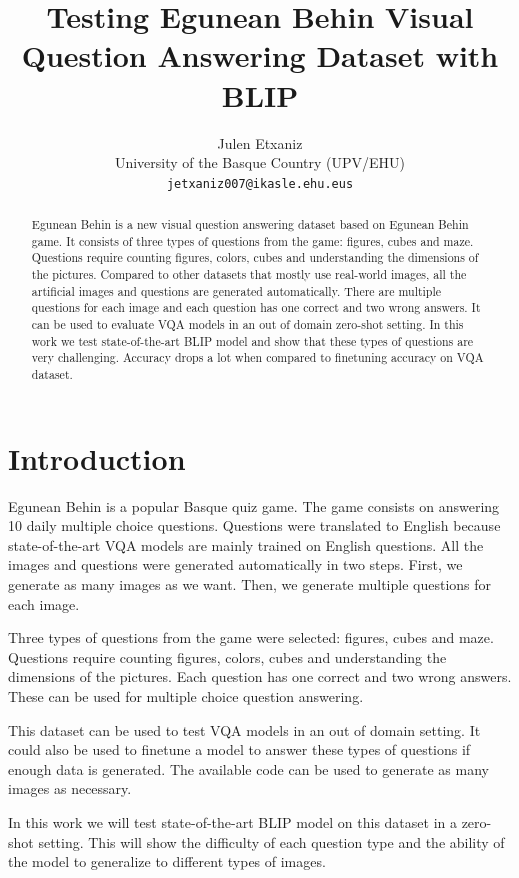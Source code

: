 \documentclass[11pt]{article}
\title{Testing Egunean Behin Visual Question Answering Dataset with BLIP}
\author{Julen Etxaniz \\
  University of the Basque Country (UPV/EHU) \\
  \texttt{jetxaniz007@ikasle.ehu.eus}}
\begin{document}
\maketitle
\begin{abstract}
Egunean Behin is a new visual question answering dataset based on Egunean Behin game. It consists of three types of questions from the game: figures, cubes and maze. Questions require counting figures, colors, cubes and understanding the dimensions of the pictures. Compared to other datasets that mostly use real-world images, all the artificial images and questions are generated automatically. There are multiple questions for each image and each question has one correct and two wrong answers. It can be used to evaluate VQA models in an out of domain zero-shot setting. In this work we test state-of-the-art BLIP model and show that these types of questions are very challenging. Accuracy drops a lot when compared to finetuning accuracy on VQA dataset.
\end{abstract}

\section{Introduction}

Egunean Behin is a popular Basque quiz game. The game consists on answering 10 daily multiple choice questions. Questions were translated to English because state-of-the-art VQA models are mainly trained on English questions. All the images and questions were generated automatically in two steps. First, we generate as many images as we want. Then, we generate multiple questions for each image. 

Three types of questions from the game were selected: figures, cubes and maze. Questions require counting figures, colors, cubes and understanding the dimensions of the pictures. Each question has one correct and two wrong answers. These can be used for multiple choice question answering.

This dataset can be used to test VQA models in an out of domain setting. It could also be used to finetune a model to answer these types of questions if enough data is generated. The available code can be used to generate as many images as necessary.

In this work we will test state-of-the-art BLIP \cite{li2022blip} model on this dataset in a zero-shot setting. This will show the difficulty of each question type and the ability of the model to generalize to different types of images.
\end{document}

